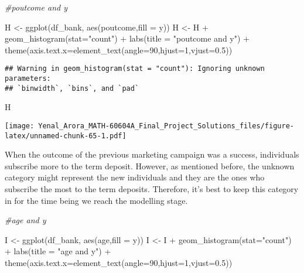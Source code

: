 \documentclass[
]{article}
\newenvironment{Shaded}{\begin{snugshade}}{\end{snugshade}}
\newcommand{\AttributeTok}[1]{\textcolor[rgb]{0.77,0.63,0.00}{#1}}
\newcommand{\CommentTok}[1]{\textcolor[rgb]{0.56,0.35,0.01}{\textit{#1}}}
\newcommand{\DecValTok}[1]{\textcolor[rgb]{0.00,0.00,0.81}{#1}}
\newcommand{\FloatTok}[1]{\textcolor[rgb]{0.00,0.00,0.81}{#1}}
\newcommand{\FunctionTok}[1]{\textcolor[rgb]{0.00,0.00,0.00}{#1}}
\newcommand{\NormalTok}[1]{#1}
\newcommand{\OtherTok}[1]{\textcolor[rgb]{0.56,0.35,0.01}{#1}}
\newcommand{\SpecialCharTok}[1]{\textcolor[rgb]{0.00,0.00,0.00}{#1}}
\newcommand{\StringTok}[1]{\textcolor[rgb]{0.31,0.60,0.02}{#1}}
\begin{document}
\begin{Shaded}
\begin{Highlighting}[]
\CommentTok{\#poutcome and y}

\NormalTok{H }\OtherTok{\textless{}{-}} \FunctionTok{ggplot}\NormalTok{(df\_bank, }\FunctionTok{aes}\NormalTok{(poutcome,}\AttributeTok{fill =}\NormalTok{ y))}
\NormalTok{H }\OtherTok{\textless{}{-}}\NormalTok{ H }\SpecialCharTok{+} \FunctionTok{geom\_histogram}\NormalTok{(}\AttributeTok{stat=}\StringTok{"count"}\NormalTok{) }\SpecialCharTok{+} \FunctionTok{labs}\NormalTok{(}\AttributeTok{title =} \StringTok{"poutcome and y"}\NormalTok{) }\SpecialCharTok{+}
  \FunctionTok{theme}\NormalTok{(}\AttributeTok{axis.text.x=}\FunctionTok{element\_text}\NormalTok{(}\AttributeTok{angle=}\DecValTok{90}\NormalTok{,}\AttributeTok{hjust=}\DecValTok{1}\NormalTok{,}\AttributeTok{vjust=}\FloatTok{0.5}\NormalTok{))}
\end{Highlighting}
\end{Shaded}

\begin{verbatim}
## Warning in geom_histogram(stat = "count"): Ignoring unknown parameters:
## `binwidth`, `bins`, and `pad`
\end{verbatim}

\begin{Shaded}
\begin{Highlighting}[]
\NormalTok{H}
\end{Highlighting}
\end{Shaded}

\texttt{[image: Yenal\_Arora\_MATH-60604A\_Final\_Project\_Solutions\_files/figure-latex/unnamed-chunk-65-1.pdf]}

When the outcome of the previous marketing campaign was a success,
individuals subscribe more to the term deposit. However, as mentioned
before, the unknown category might represent the new individuals and
they are the ones who subscribe the most to the term deposits.
Therefore, it's best to keep this category in for the time being we
reach the modelling stage.

\begin{Shaded}
\begin{Highlighting}[]
\CommentTok{\#age and y}

\NormalTok{I }\OtherTok{\textless{}{-}} \FunctionTok{ggplot}\NormalTok{(df\_bank, }\FunctionTok{aes}\NormalTok{(age,}\AttributeTok{fill =}\NormalTok{ y))}
\NormalTok{I }\OtherTok{\textless{}{-}}\NormalTok{ I }\SpecialCharTok{+} \FunctionTok{geom\_histogram}\NormalTok{(}\AttributeTok{stat=}\StringTok{"count"}\NormalTok{) }\SpecialCharTok{+} \FunctionTok{labs}\NormalTok{(}\AttributeTok{title =} \StringTok{"age and y"}\NormalTok{) }\SpecialCharTok{+}
  \FunctionTok{theme}\NormalTok{(}\AttributeTok{axis.text.x=}\FunctionTok{element\_text}\NormalTok{(}\AttributeTok{angle=}\DecValTok{90}\NormalTok{,}\AttributeTok{hjust=}\DecValTok{1}\NormalTok{,}\AttributeTok{vjust=}\FloatTok{0.5}\NormalTok{))}
\end{Highlighting}
\end{Shaded}
\end{document}
